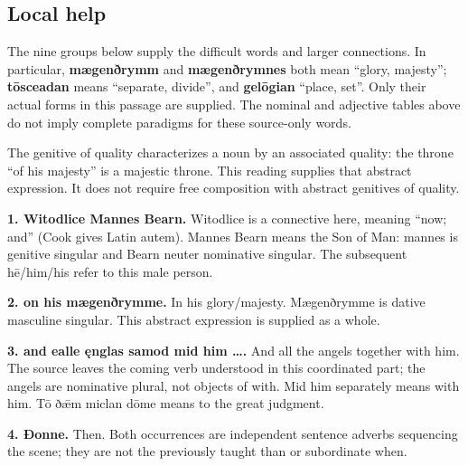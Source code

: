 \subsection*{Local help}

The nine groups below supply the difficult words and larger connections. In particular, \textbf{mægenðrymm} and \textbf{mægenðrymnes} both mean “glory, majesty”; \textbf{tōsceadan} means “separate, divide”, and \textbf{gelōgian} “place, set”. Only their actual forms in this passage are supplied. The nominal and adjective tables above do not imply complete paradigms for these source-only words.

The genitive of quality characterizes a noun by an associated quality: the throne “of his majesty” is a majestic throne. This reading supplies that abstract expression. It does not require free composition with abstract genitives of quality.

\textbf{1. Witodlice Mannes Bearn.} Witodlice is a connective here, meaning “now; and” (Cook gives Latin autem). Mannes Bearn means the Son of Man: mannes is genitive singular and Bearn neuter nominative singular. The subsequent hē/\allowbreak{}him/\allowbreak{}his refer to this male person.

\textbf{2. on his mægenðrymme.} In his glory/\allowbreak{}majesty. Mægenðrymme is dative masculine singular. This abstract expression is supplied as a whole.

\textbf{3. and ealle ęnglas samod mid him ….} And all the angels together with him. The source leaves the coming verb understood in this coordinated part; the angels are nominative plural, not objects of with. Mid him separately means with him. Tō ðǣm miclan dōme means to the great judgment.

\textbf{4. Ðonne.} Then. Both occurrences are independent sentence adverbs sequencing the scene; they are not the previously taught than or subordinate when.

